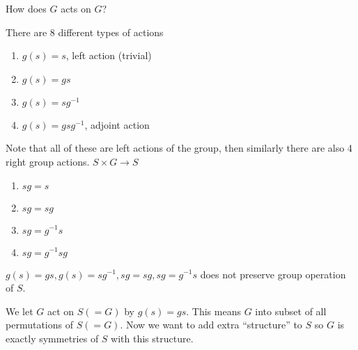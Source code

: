 \documentclass[12pt,letterpaper]{article}
\begin{document}
\begin{question}
	How does $G$ acts on $G$?
\end{question}
\begin{definition}
	There are 8 different types of actions
	\begin{enumerate}
		\item $g(s) = s$, left action (trivial)
		\item $g(s) = gs$
		\item $g(s) = sg^{-1}$
		\item $g(s) = gsg^{-1}$, adjoint action
	\end{enumerate}
	Note that all of these are left actions of the group, then similarly there are also 4 right group actions. $S \times G \to S$
	\begin{enumerate}
		\item $sg = s$
		\item $sg = sg$
		\item $sg = g^{-1} s$
		\item $sg = g^{-1}sg$
	\end{enumerate}
\end{definition}
\begin{remark}
	$g(s) = gs, g(s) = sg^{-1}, sg = sg, sg = g^{-1}s$ does not preserve group operation of $S$.
\end{remark}
We let $G$ act on $S(=G)$ by $g(s) = gs$. This means $G$ into subset of all permutations of $S(=G)$. Now we want to add extra ``structure'' to $S$ so $G$ is exactly symmetries of $S$ with this structure.
\end{document}
